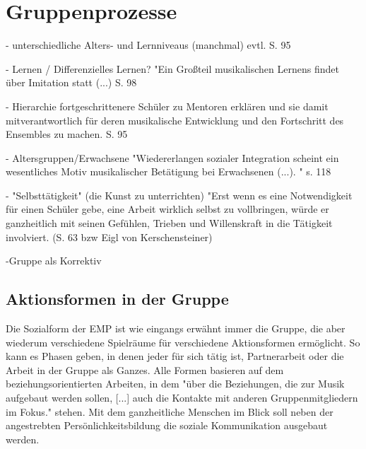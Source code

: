 \section{Gruppenprozesse}




- unterschiedliche Alters- und Lernniveaus (manchmal) evtl. S. 95

- Lernen / Differenzielles Lernen? 
"Ein Großteil musikalischen Lernens findet über Imitation statt (...) S. 98

- Hierarchie
fortgeschrittenere Schüler zu Mentoren erklären und sie damit mitverantwortlich
für deren musikalische Entwicklung und den Fortschritt des Ensembles zu machen.
S. 95

- Altersgruppen/Erwachsene
"Wiedererlangen sozialer Integration scheint ein wesentliches Motiv
musikalischer Betätigung bei Erwachsenen (...). " s. 118

- "Selbsttätigkeit" (die Kunst zu unterrichten)
"Erst wenn es eine Notwendigkeit für einen Schüler gebe, eine Arbeit wirklich
selbst zu vollbringen, würde er ganzheitlich mit seinen Gefühlen, Trieben und
Willenskraft in die Tätigkeit involviert. (S. 63 bzw Eigl von Kerschensteiner)

-Gruppe als Korrektiv



\subsection{Aktionsformen in der Gruppe}
Die Sozialform der EMP ist wie eingangs erwähnt immer die Gruppe, die aber
wiederum verschiedene Spielräume für verschiedene Aktionsformen ermöglicht. So
kann es Phasen geben, in denen jeder für sich tätig ist, Partnerarbeit oder die
Arbeit in der Gruppe als Ganzes. Alle Formen basieren auf dem beziehungsorientierten
Arbeiten, in dem "über die Beziehungen, die zur Musik aufgebaut werden sollen,
[...] auch die Kontakte mit anderen Gruppenmitgliedern im Fokus."
\autocite[10]{dartsch:kern_des_musizierens} stehen. Mit dem ganzheitliche Menschen im
Blick soll neben der angestrebten Persönlichkeitsbildung die soziale
Kommunikation ausgebaut werden.

